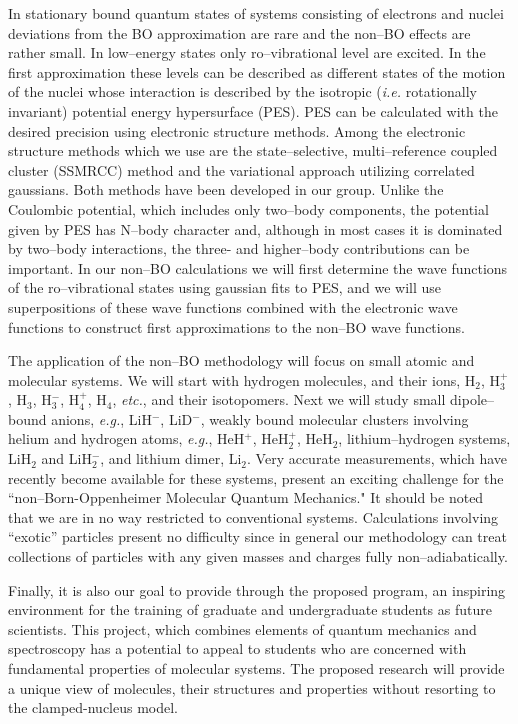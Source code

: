 In 
stationary bound
quantum states of 
systems 
consisting of electrons and nuclei
deviations from the BO approximation
are rare and the non--BO effects
are rather small. 
In low--energy states only  
ro--vibrational level are excited.
In the first approximation  these levels can be
described as different states of the motion
of the nuclei whose interaction is described by the
isotropic ({\it i.e.} rotationally invariant)
potential energy hypersurface (PES).
PES can be calculated with the desired precision using
electronic structure methods.
Among the electronic structure methods which we
use are
the state--selective, multi--reference coupled cluster (SSMRCC)
method and the variational approach utilizing correlated gaussians.
Both methods have been developed in our group. 
Unlike the Coulombic potential, which includes only two--body
components, the potential given by PES has N--body character and,
although in most cases it is dominated by two--body interactions,
the three- and higher--body contributions can be important.
In our non--BO calculations we will first determine the
wave functions of the ro--vibrational states using
gaussian fits to PES, and we will use superpositions
of these wave functions combined with the electronic wave functions
to construct first approximations to the non--BO wave functions.


The application of the non--BO 
methodology 
will focus on
small atomic and molecular systems.
We will start with
hydrogen molecules, and their ions,
H$_2$, H$_3^+$, H$_3$, H$_3^-$, H$_4^+$, H$_4$, {\it etc.},
and their isotopomers. Next we will study    
small dipole--bound anions, {\it e.g.}, LiH$^-$, LiD$^-$,
weakly bound molecular clusters involving 
helium and hydrogen atoms, {\it e.g.}, HeH$^+$, HeH$_2^+$, HeH$_2$,
lithium--hydrogen systems, LiH$_2$ and LiH$_2^-$,
and lithium dimer, Li$_2$.  
Very accurate measurements, which have 
recently become
available 
for these systems,
present an exciting challenge for 
the ``non--Born-Oppenheimer Molecular Quantum Mechanics."
It should be noted 
that we are in no way restricted to conventional systems.
Calculations involving ``exotic'' particles present no difficulty 
since in general our methodology can treat collections of particles
with any given masses and charges fully non--adiabatically.  
 

Finally, it is also our goal to
provide through the proposed program, an inspiring environment 
for the training of graduate and undergraduate students as
future scientists. This project, which combines elements of 
quantum mechanics and spectroscopy has a potential to appeal
to students who are 
concerned with 
fundamental properties of molecular systems.
The proposed research will provide a unique view of molecules,
their structures and properties without resorting to
the clamped-nucleus model.


